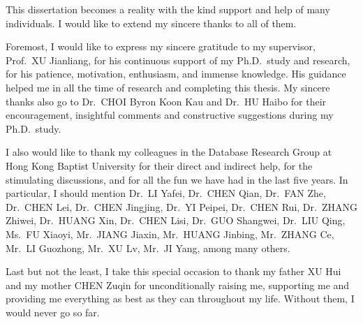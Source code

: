 \begin{acknowledgements}
This dissertation becomes a reality with the kind support and help of many individuals. I would like to extend my sincere thanks to all of them.

Foremost, I would like to express my sincere gratitude to my supervisor, Prof.\ XU Jianliang, for his continuous support of my Ph.D.\ study and research, for his patience, motivation, enthusiasm, and immense knowledge. His guidance helped me in all the time of research and completing this thesis. My sincere thanks also go to Dr.\ CHOI Byron Koon Kau and Dr.\ HU Haibo for their encouragement, insightful comments and constructive suggestions during my Ph.D.\ study.

I also would like to thank my colleagues in the Database Research Group at Hong Kong Baptist University for their direct and indirect help, for the stimulating discussions, and for all the fun we have had in the last five years. In particular, I should mention Dr.\ LI Yafei, Dr.\ CHEN Qian, Dr.\ FAN Zhe, Dr.\ CHEN Lei, Dr.\ CHEN Jingjing, Dr.\ YI Peipei, Dr.\ CHEN Rui, Dr.\ ZHANG Zhiwei, Dr.\ HUANG Xin, Dr.\ CHEN Lisi, Dr.\ GUO Shangwei, Dr.\ LIU Qing, Ms.\ FU Xiaoyi, Mr.\ JIANG Jiaxin, Mr.\ HUANG Jinbing, Mr.\ ZHANG Ce, Mr.\ LI Guozhong, Mr.\ XU Lv, Mr.\ JI Yang, among many others.

Last but not the least, I take this special occasion to thank my father XU Hui and my mother CHEN Zuqin for unconditionally raising me, supporting me and providing me everything as best as they can throughout my life. Without them, I would never go so far.
\end{acknowledgements}
